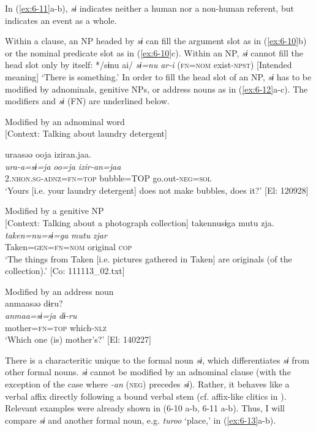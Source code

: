 In (\ref{ex:6-11}a-b), \textit{sɨ} indicates neither a human nor a non-human referent, but indicates an event as a whole.

  Within a clause, an NP headed by \textit{sɨ} can fill the argument slot as in (\ref{ex:6-10}b) or the nominal predicate slot as in (\ref{ex:6-10}c). Within an NP, \textit{sɨ} cannot fill the head slot only by itself: */sɨnu ai/ \textit{sɨ=nu} \textit{ar-i} (\textsc{fn}=\textsc{nom} exist-\textsc{npst}) [Intended meaning] ‘There is something.’ In order to fill the head slot of an NP, \textit{sɨ} has to be modified by adnominals, genitive NPs, or address nouns as in (\ref{ex:6-12}a-c). The modifiers and \textit{sɨ} (FN) are underlined below.

\ea\label{ex:6-12}
\ea Modified by an adnominal word\\{}
[Context: Talking about laundry detergent]

{\TM}
\glll uraasəə  ooja  iziran.jaa.\\
      \textit{ura-a=sɨ=ja}  \textit{oo=ja}  \textit{izir-an=jaa}\\
      2.\textsc{nhon}.\textsc{sg}-\textsc{adnz}=\textsc{fn}=\textsc{top}  bubble=TOP  go.out-\textsc{neg}=\textsc{sol}\\
\glt ‘Yours [i.e. your laundry detergent] does not make bubbles, does it?’ [El: 120928]

\ex Modified by a genitive NP\\{}
[Context: Talking about a photograph collection]
{\TM}
\glll {\textbar}taken{\textbar}nusɨga  mutu  zja.\\
      \textit{taken=nu=sɨ=ga}  \textit{mutu}  \textit{zjar}\\
      Taken=\textsc{gen}=\textsc{fn}=\textsc{nom}  original  \textsc{cop}\\
\glt ‘The things from Taken [i.e. pictures gathered in Taken] are originals (of the collection).’ [Co: 111113\_02.txt]

\ex Modified by an address noun\\
{\TM}
\glll  anmaasəə  dɨru?\\
\textit{anmaa=sɨ=ja}  \textit{dɨ-ru}\\
mother=\textsc{fn}=\textsc{top}  which-\textsc{nlz}\\
\glt ‘Which one (is) mother’s?’ [El: 140227]
\z

There is a characteritic unique to the formal noun \textit{sɨ}, which differentiates \textit{sɨ} from other formal nouns. \textit{sɨ} cannot be modified by an adnominal clause (with the exception of the case where \textit{-an} (\textsc{neg}) precedes \textit{sɨ}). Rather, it behaves like a verbal affix directly following a bound verbal stem (cf. affix-like clitics in ). Relevant examples were already shown in (6-10 a-b, 6-11 a-b). Thus, I will compare \textit{sɨ} and another formal noun, e.g. \textit{turoo} ‘place,’ in (\ref{ex:6-13}a-b).

